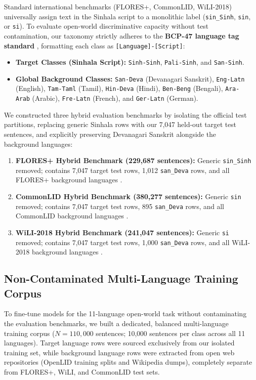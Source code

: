 \documentclass[11pt]{article}
\begin{document}
Standard international benchmarks (FLORES+, CommonLID, WiLI-2018) universally assign text in the Sinhala script to a monolithic label (\texttt{sin\_Sinh}, \texttt{sin}, or \texttt{si}). To evaluate open-world discriminative capacity without test contamination, our taxonomy strictly adheres to the \textbf{BCP-47 language tag standard} \cite{phillips2009tags}, formatting each class as \texttt{[Language]-[Script]}:
\begin{itemize}
    \item \textbf{Target Classes (Sinhala Script):} \texttt{Sinh-Sinh}, \texttt{Pali-Sinh}, and \texttt{San-Sinh}.
    \item \textbf{Global Background Classes:} \texttt{San-Deva} (Devanagari Sanskrit), \texttt{Eng-Latn} (English), \texttt{Tam-Taml} (Tamil), \texttt{Hin-Deva} (Hindi), \texttt{Ben-Beng} (Bengali), \texttt{Ara-Arab} (Arabic), \texttt{Fre-Latn} (French), and \texttt{Ger-Latn} (German).
\end{itemize}

We constructed three hybrid evaluation benchmarks by isolating the official test partitions, replacing generic Sinhala rows with our 7,047 held-out target test sentences, and explicitly preserving Devanagari Sanskrit alongside the background languages:
\begin{enumerate}
    \item \textbf{FLORES+ Hybrid Benchmark (229,687 sentences):} Generic \texttt{sin\_Sinh} removed; contains 7,047 target test rows, 1,012 \texttt{san\_Deva} rows, and all FLORES+ background languages \cite{goyal2022flores}.
    \item \textbf{CommonLID Hybrid Benchmark (380,277 sentences):} Generic \texttt{sin} removed; contains 7,047 target test rows, 895 \texttt{san\_Deva} rows, and all CommonLID background languages \cite{dunn2023commonlid}.
    \item \textbf{WiLI-2018 Hybrid Benchmark (241,047 sentences):} Generic \texttt{si} removed; contains 7,047 target test rows, 1,000 \texttt{san\_Deva} rows, and all WiLI-2018 background languages \cite{thoma2018wili}.
\end{enumerate}

\subsection{Non-Contaminated Multi-Language Training Corpus}
To fine-tune models for the 11-language open-world task without contaminating the evaluation benchmarks, we built a dedicated, balanced multi-language training corpus ($N=110,000$ sentences; 10,000 sentences per class across all 11 languages). Target language rows were sourced exclusively from our isolated training set, while background language rows were extracted from open web repositories (OpenLID training splits and Wikipedia dumps), completely separate from FLORES+, WiLI, and CommonLID test sets.
\end{document}
